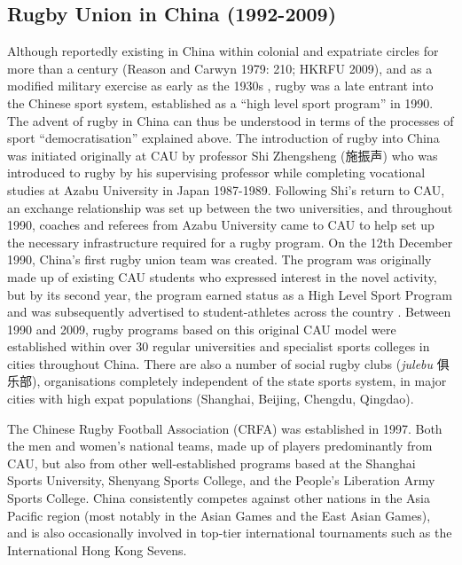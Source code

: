 \begin{CJK}{UTF8}{gbsn}
    \subsection{Rugby Union in China (1992-2009)}
Although reportedly existing in China within colonial and expatriate circles for more than a century (Reason and Carwyn 1979: 210; HKRFU 2009), and as a modified military exercise as early as the 1930s \citep[135]{Morris2004}, rugby was a late entrant into the Chinese sport system, established as a ``high level sport program'' in 1990.  The advent of rugby in China can thus be understood in terms of the processes of sport ``democratisation'' explained above.  The introduction of rugby into China was initiated originally at CAU by professor Shi Zhengsheng (施振声) who was introduced to rugby by his
supervising professor while completing vocational studies at Azabu University in Japan 1987-1989.  Following Shi’s return to CAU, an exchange relationship was set up between the two universities, and throughout 1990, coaches and referees from Azabu University came to CAU to help set up the necessary infrastructure required for a rugby program.  On the 12th December 1990, China’s first rugby union team was created.  The program was originally made up of existing CAU students who expressed interest in the novel activity, but by its second year, the program earned status as a High Level Sport Program and was subsequently advertised to student-athletes across the country \citep[2]{Xu2010}.  Between 1990 and 2009, rugby programs based on this original CAU model were established within over 30 regular universities and specialist sports colleges in cities throughout China.  There are also a number of social rugby clubs (\textit{julebu} 俱乐部), organisations completely independent of the state sports system, in major cities with high expat populations (Shanghai, Beijing, Chengdu, Qingdao).

The Chinese Rugby Football Association (CRFA) was established in 1997. Both the men and women’s national teams, made up of players predominantly from CAU, but also from other well-established programs based at the Shanghai Sports University, Shenyang Sports College, and the People’s Liberation Army Sports College. China consistently competes against other nations in the Asia Pacific region (most notably in the Asian Games and the East Asian Games), and is also occasionally involved in top-tier international tournaments such as the International Hong Kong Sevens.


\end{CJK}

